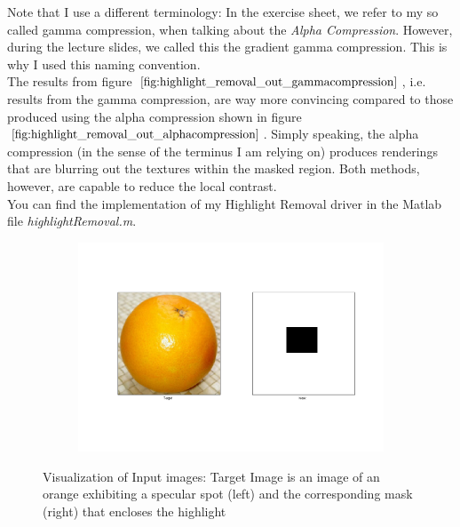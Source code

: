 \documentclass{paper}
\begin{document}
Note that I use a different terminology: In the exercise sheet, we refer to my so called gamma compression, when talking about the \emph{Alpha Compression}. However, during the lecture slides, we called this the gradient gamma compression. This is why I used this naming convention. \\

The results from figure $\ref{fig:highlight_removal_out_gammacompression}$, i.e. results from the gamma compression, are way more convincing compared to those produced using the alpha compression shown in figure $\ref{fig:highlight_removal_out_alphacompression}$. Simply speaking, the alpha compression (in the sense of the terminus I am relying on) produces renderings that are blurring out the textures within the masked region. Both methods, however, are capable to reduce the local contrast. \\

You can find the implementation of my Highlight Removal driver in the Matlab file \emph{highlightRemoval.m}.


\begin{figure}[H]
    \centering
    \begin{subfigure}{1.0\textwidth}
        \includegraphics[width=\textwidth]{../../outputs/p4/highlight_removal/input}
    \end{subfigure}
    \caption{Visualization of Input images: Target Image is an image of an orange exhibiting a specular spot (left) and the corresponding mask (right) that encloses the highlight}
    \label{fig:highlight_removal_input}       
\end{figure}
\end{document}
